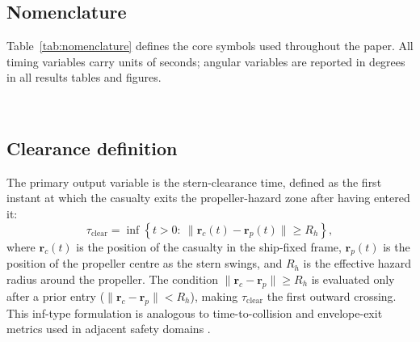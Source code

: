 \documentclass[preprint,12pt]{elsarticle}
\begin{document}
\subsection{Nomenclature}
Table~\ref{tab:nomenclature} defines the core symbols used throughout the paper. All timing variables carry units of seconds; angular variables are reported in degrees in all results tables and figures.
\begin{table}[H]
\centering
{}\
\caption{Core symbols and units.}
\label{tab:nomenclature}
\end{table}

\subsection{Clearance definition}
The primary output variable is the stern-clearance time, defined as the first instant at which the casualty exits the propeller-hazard zone after having entered it:
\begin{equation}
\tau_{\mathrm{clear}} = \inf\left\{t>0:\ \|\mathbf{r}_c(t)-\mathbf{r}_p(t)\|\ge R_h\right\},
\end{equation}
where $\mathbf{r}_c(t)$ is the position of the casualty in the ship-fixed frame, $\mathbf{r}_p(t)$ is the position of the propeller centre as the stern swings, and $R_h$ is the effective hazard radius around the propeller. The condition $\|\mathbf{r}_c-\mathbf{r}_p\|\ge R_h$ is evaluated only after a prior entry ($\|\mathbf{r}_c-\mathbf{r}_p\|<R_h$), making $\tau_{\mathrm{clear}}$ the first outward crossing. This inf-type formulation is analogous to time-to-collision and envelope-exit metrics used in adjacent safety domains \cite{ref_land_aeb,ref_aviation_envelope}.
\end{document}

